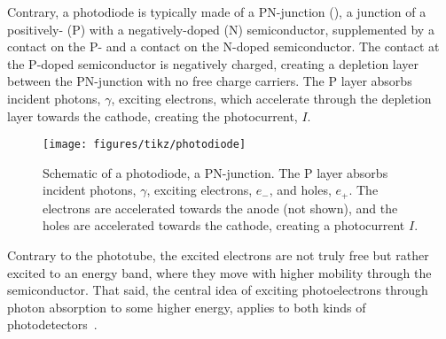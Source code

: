 Contrary, a photodiode is typically made of a PN-junction (), a junction of a positively- (P) with a negatively-doped (N) semiconductor, supplemented by a contact on the P- and a contact on the N-doped semiconductor.
The contact at the P-doped semiconductor is negatively charged, creating a depletion layer between the PN-junction with no free charge carriers.
The P layer absorbs incident photons, $\gamma$, exciting electrons, which accelerate through the depletion layer towards the cathode, creating the photocurrent, $I$.
\begin{figure}[htb]
    \centering
    \texttt{[image: figures/tikz/photodiode]}
    \caption{Schematic of a photodiode, a PN-junction. The P layer absorbs incident photons, $\gamma$, exciting electrons, $e_-$, and holes, $e_+$. The electrons are accelerated towards the anode (not shown), and the holes are accelerated towards the cathode, creating a photocurrent $I$.}\label{fig:photodiode}
\end{figure}
Contrary to the phototube, the excited electrons are not truly free but rather excited to an energy band, where they move with higher mobility through the semiconductor.
That said, the central idea of exciting photoelectrons through photon absorption to some higher energy, applies to both kinds of photodetectors~\cite[p.~128]{Cohen1992}.

